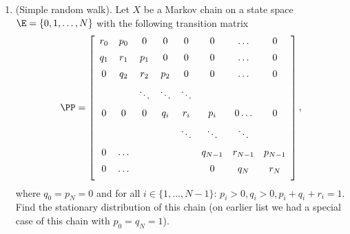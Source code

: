 \documentclass[a4paper,12pt]{article}
\begin{document}
 
\noindent
 {
\setlength\fboxsep{4pt}%
 \setlength\fboxrule{2pt}%
 } \bigskip\bigskip
\par \bigskip


\begin{enumerate}
\item 
  (Simple random walk). Let $X$ be a Markov chain on a state space $\E=\{0,1,\ldots,N\}$ with the following transition matrix
$$\PP=\left[
\begin{array}{ccccccccc}
r_0 & p_0 & 0 & 0 & 0  & 0 &\ldots & 0 \\[5pt]
q_1 & r_1 & p_1 & 0 & 0 & 0 &\ldots & 0 \\[5pt]
0 & q_2 & r_2 & p_2 & 0 & 0 &\ldots & 0\\[5pt]
  &      & \ddots& \ddots& \ddots\\[5pt]
0 & 0 & 0 & q_i & r_i & p_i &0 \ldots &0 \\[5pt]
 &  & &      & \ddots& \ddots& \ddots\\[5pt]
 0&\ldots &  & &      & q_{N-1} & r_{N-1} & p_{N-1} \\[5pt]
 0&\ldots &  & &      & 0 & q_N & r_N \\[5pt]
    \end{array}\right],$$
where $q_0=p_N=0$ and for all $i\in\{1,\ldots,N-1\}$: $p_i>0, q_i>0, p_i+q_i+r_i=1$. Find the stationary distribution of this chain (on earlier list we had a special case of this chain with $p_0=q_N=1$).



\end{enumerate}
\end{document}
